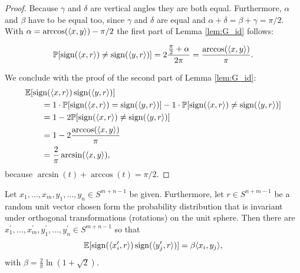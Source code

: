 \begin{proof}
\begin{minipage}{\textwidth}
			\hspace{12pt} Because $\gamma$ and $\delta$ are vertical angles they are both equal. Furthermore, $\alpha$ and $\beta$ have to be equal too, since $\gamma$ and $\delta$ are equal and $\alpha+\delta = \beta+\gamma = \pi/2$. With $\alpha = \arccos(\langle{x},{y}\rangle) - \pi/2$ the first part of Lemma \ref{lem:G_id} follows:
		\end{minipage}
		\begin{align*}
			\mathbb{P}[\operatorname{sign}(\langle{x},{r}\rangle)\neq\operatorname{sign}(\langle{y},{r}\rangle)]=2\frac{\frac{\pi}{2}+\alpha}{2\pi} = \frac{\arccos(\langle{x},{y}\rangle)}{\pi}.
		\end{align*}
		
		\noindent We conclude with the proof of the second part of Lemma \ref{lem:G_id}: 
		\begin{align*}
			&\mathbb{E}[\operatorname{sign}(\langle{x},{r}\rangle) \operatorname{sign}(\langle{y},{r}\rangle)] \\
			&\qquad= 1\cdot\mathbb{P}[\operatorname{sign}(\langle{x},{r}\rangle) = \operatorname{sign} (\langle{y},{r}\rangle )] - 1\cdot \mathbb{P}[\operatorname{sign}(\langle{x},{r}\rangle) \neq \operatorname{sign}(\langle{y},{r}\rangle)] \\
			&\qquad= 1 - 2\mathbb{P}[\operatorname{sign}(\langle{x},{r}\rangle) \neq \operatorname{sign}(\langle{y},{r}\rangle)] \\
			&\qquad= 1 - 2 \frac{\arccos(\langle{x},{y}\rangle)}{\pi} \\
			&\qquad= \frac{2}{\pi} \arcsin(\langle{x},{y}\rangle),
		\end{align*}
		because $\arcsin (t) + \arccos(t) = \pi/2$.
	\end{proof}
	
	\begin{lemma}\label{lem:krivines_trick}
		Let $x_1,\dots,x_m,y_1,\dots,y_n\in S^{m+n-1}$ be given. Furthermore, let $r\in S^{n+m-1}$ be a random unit vector chosen form the probability distribution that is invariant under orthogonal transformations (rotations) on the unit sphere. Then there are $x_1^\prime,\dots,x_m^\prime, y_1^\prime,\dots,y_n^\prime\in S^{m+n-1}$ so that
		\begin{equation}
			\mathbb{E}[\operatorname{sign}(\langle{x_i^\prime},{r}\rangle)\operatorname{sign}(\langle{y_j^\prime},{r}\rangle)] = \beta \langle{x_i},{y_j}\rangle,
			\label{eq:krivines_trick}
		\end{equation}		
		with $\beta = \frac{2}{\pi} \ln (1+\sqrt{2}).$
	\end{lemma}
	
